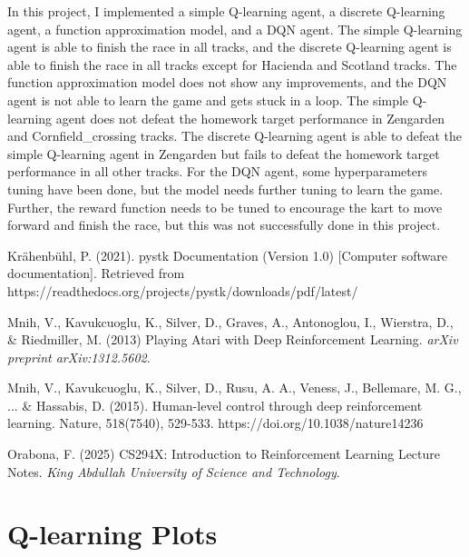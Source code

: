\documentclass{article}
\begin{document}
In this project, I implemented a simple Q-learning agent, a discrete Q-learning agent, a function approximation model, and a DQN agent. The simple Q-learning agent is able to finish the race in all tracks, and the discrete Q-learning agent is able to finish the race in all tracks except for Hacienda and Scotland tracks. The function approximation model does not show any improvements, and the DQN agent is not able to learn the game and gets stuck in a loop. The simple Q-learning agent does not defeat the homework target performance in Zengarden and Cornfield\_crossing tracks. The discrete Q-learning agent is able to defeat the simple Q-learning agent in Zengarden but fails to defeat the homework target performance in all other tracks. For the DQN agent, some hyperparameters tuning have been done, but the model needs further tuning to learn the game. Further, the reward function needs to be tuned to encourage the kart to move forward and finish the race, but this was not successfully done in this project.


\begin{thebibliography}{2}

Krähenbühl, P. (2021). pystk Documentation (Version 1.0) [Computer software documentation]. Retrieved from https://readthedocs.org/projects/pystk/downloads/pdf/latest/

Mnih, V., Kavukcuoglu, K., Silver, D., Graves, A., Antonoglou, I., Wierstra, D., \& Riedmiller, M. (2013) Playing Atari with Deep Reinforcement Learning. {\it arXiv preprint arXiv:1312.5602}.

Mnih, V., Kavukcuoglu, K., Silver, D., Rusu, A. A., Veness, J., Bellemare, M. G., ... \& Hassabis, D. (2015). Human-level control through deep reinforcement learning. Nature, 518(7540), 529-533. https://doi.org/10.1038/nature14236

Orabona, F. (2025) CS294X: Introduction to Reinforcement Learning Lecture Notes. {\it King Abdullah University of Science and Technology}.

\end{thebibliography}


\appendix

\section{Q-learning Plots}
\label{qlearning_plots}
\end{document}
